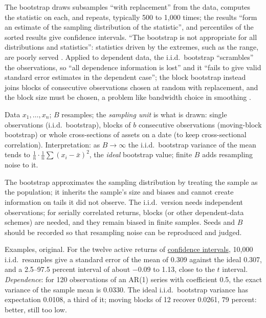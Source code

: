 \begin{qfmethod}\label{meth:bootstrap-resampling}
 The bootstrap draws subsamples ``with replacement'' from the data, computes the statistic on each, and repeats, typically 500 to 1{,}000 times; the results ``form an estimate of the sampling distribution of the statistic'', and percentiles of the sorted results give confidence intervals. ``The bootstrap is not appropriate for all distributions and statistics'': statistics driven by the extremes, such as the range, are poorly served \citep[sec.~1.3.3.4]{statistical-methods-handbook}. Applied to dependent data, the i.i.d.\ bootstrap ``scrambles'' the observations, so ``all dependence information is lost'' and it ``fails to give valid standard error estimates in the dependent case''; the block bootstrap instead joins blocks of consecutive observations chosen at random with replacement, and the block size must be chosen, a problem like bandwidth choice in smoothing \citep[secs.~2 and~2.3, pp.~221--223]{bootstrap-time-series-2003}.

 Data $x_1,\dots,x_n$; $B$ resamples; the \emph{sampling unit} is what is drawn: single observations (i.i.d.\ bootstrap), blocks of $b$ consecutive observations (moving-block bootstrap) or whole cross-sections of assets on a date (to keep cross-sectional correlation). Interpretation: as $B\to\infty$ the i.i.d.\ bootstrap variance of the mean tends to $\frac1n\cdot\frac1n\sum(x_i-\bar x)^2$, the \emph{ideal} bootstrap value; finite $B$ adds resampling noise to it.

 The bootstrap approximates the sampling distribution by treating the sample as the population; it inherits the sample's size and biases and cannot create information on tails it did not observe. The i.i.d.\ version needs independent observations; for serially correlated returns, blocks (or other dependent-data schemes) are needed, and they remain biased in finite samples. Seeds and $B$ should be recorded so that resampling noise can be reproduced and judged.

 Examples, original. For the twelve active returns of \hyperref[meth:confidence-intervals]{confidence intervals}, 10{,}000 i.i.d.\ resamples give a standard error of the mean of 0.309 against the ideal 0.307, and a 2.5--97.5 percent interval of about $-0.09$ to 1.13, close to the $t$ interval. \emph{Dependence}: for 120 observations of an AR(1) series with coefficient 0.5, the exact variance of the sample mean is 0.0330. The ideal i.i.d.\ bootstrap variance has expectation 0.0108, a third of it; moving blocks of 12 recover 0.0261, 79 percent: better, still too low.


\end{qfmethod}
